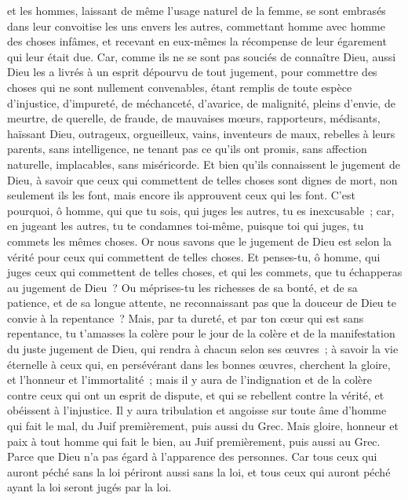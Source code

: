 \begin{multicols}{2}
et les hommes, laissant de même l'usage naturel de la femme, se sont embrasés dans leur convoitise les uns envers les autres, commettant homme avec homme des choses infâmes, et recevant en eux-mêmes la récompense de leur égarement qui leur était due.
Car, comme ils ne se sont pas souciés de connaître Dieu, aussi Dieu les a livrés à un esprit dépourvu de tout jugement, pour commettre des choses qui ne sont nullement convenables,
étant remplis de toute espèce d'injustice, d'impureté, de méchanceté, d'avarice, de malignité, pleins d'envie, de meurtre, de querelle, de fraude, de mauvaises mœurs,
rapporteurs, médisants, haïssant Dieu, outrageux, orgueilleux, vains, inventeurs de maux, rebelles à leurs parents,
sans intelligence, ne tenant pas ce qu'ils ont promis, sans affection naturelle, implacables, sans miséricorde.
Et bien qu'ils connaissent le jugement de Dieu, à savoir que ceux qui commettent de telles choses sont dignes de mort, non seulement ils les font, mais encore ils approuvent ceux qui les font.
\VerseOne{}C'est pourquoi, ô homme, qui que tu sois, qui juges les autres, tu es inexcusable~; car, en jugeant les autres, tu te condamnes toi-même, puisque toi qui juges, tu commets les mêmes choses.
Or nous savons que le jugement de Dieu est selon la vérité pour ceux qui commettent de telles choses.
Et penses-tu, ô homme, qui juges ceux qui commettent de telles choses, et qui les commets, que tu échapperas au jugement de Dieu~?
Ou méprises-tu les richesses de sa bonté, et de sa patience, et de sa longue attente, ne reconnaissant pas que la douceur de Dieu te convie à la repentance~?
Mais, par ta dureté, et par ton cœur qui est sans repentance, tu t'amasses la colère pour le jour de la colère et de la manifestation du juste jugement de Dieu,
qui rendra à chacun selon ses œuvres~;
à savoir la vie éternelle à ceux qui, en persévérant dans les bonnes œuvres, cherchent la gloire, et l'honneur et l'immortalité~;
mais il y aura de l'indignation et de la colère contre ceux qui ont un esprit de dispute, et qui se rebellent contre la vérité, et obéissent à l'injustice.
Il y aura tribulation et angoisse sur toute âme d'homme qui fait le mal, du Juif premièrement, puis aussi du Grec.
Mais gloire, honneur et paix à tout homme qui fait le bien, au Juif premièrement, puis aussi au Grec.
Parce que Dieu n'a pas égard à l'apparence des personnes.
Car tous ceux qui auront péché sans la loi périront aussi sans la loi, et tous ceux qui auront péché ayant la loi seront jugés par la loi.

\end{multicols}
